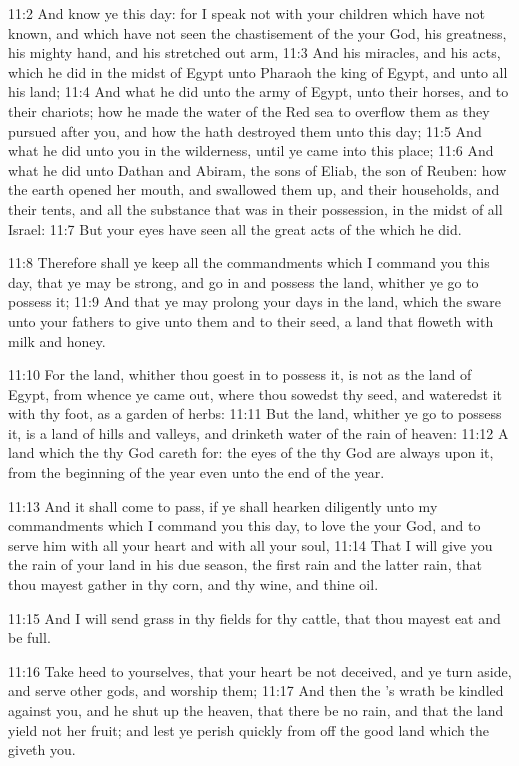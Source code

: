 11:2 And know ye this day: for I speak not with your children which have not known, and which have not seen the chastisement of the \LORD your God, his greatness, his mighty hand, and his stretched out arm, 11:3 And his miracles, and his acts, which he did in the midst of Egypt unto Pharaoh the king of Egypt, and unto all his land; 11:4 And what he did unto the army of Egypt, unto their horses, and to their chariots; how he made the water of the Red sea to overflow them as they pursued after you, and how the \LORD hath destroyed them unto this day; 11:5 And what he did unto you in the wilderness, until ye came into this place; 11:6 And what he did unto Dathan and Abiram, the sons of Eliab, the son of Reuben: how the earth opened her mouth, and swallowed them up, and their households, and their tents, and all the substance that was in their possession, in the midst of all Israel: 11:7 But your eyes have seen all the great acts of the \LORD which he did.

11:8 Therefore shall ye keep all the commandments which I command you this day, that ye may be strong, and go in and possess the land, whither ye go to possess it; 11:9 And that ye may prolong your days in the land, which the \LORD sware unto your fathers to give unto them and to their seed, a land that floweth with milk and honey.

11:10 For the land, whither thou goest in to possess it, is not as the land of Egypt, from whence ye came out, where thou sowedst thy seed, and wateredst it with thy foot, as a garden of herbs: 11:11 But the land, whither ye go to possess it, is a land of hills and valleys, and drinketh water of the rain of heaven: 11:12 A land which the \LORD thy God careth for: the eyes of the \LORD thy God are always upon it, from the beginning of the year even unto the end of the year.

11:13 And it shall come to pass, if ye shall hearken diligently unto my commandments which I command you this day, to love the \LORD your God, and to serve him with all your heart and with all your soul, 11:14 That I will give you the rain of your land in his due season, the first rain and the latter rain, that thou mayest gather in thy corn, and thy wine, and thine oil.

11:15 And I will send grass in thy fields for thy cattle, that thou mayest eat and be full.

11:16 Take heed to yourselves, that your heart be not deceived, and ye turn aside, and serve other gods, and worship them; 11:17 And then the \LORD's wrath be kindled against you, and he shut up the heaven, that there be no rain, and that the land yield not her fruit; and lest ye perish quickly from off the good land which the \LORD giveth you.

